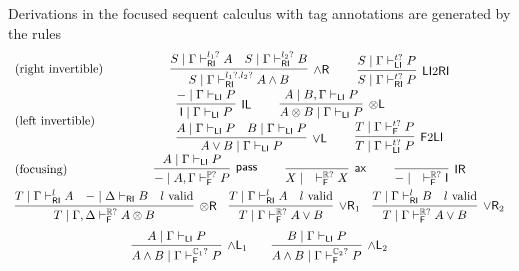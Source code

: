 \documentclass[submission,copyright,creativecommons]{eptcs}
\theoremstyle{definition}
\newcommand{\tl}{\otimes \mathsf{L}}
\newcommand{\tr}{\otimes \mathsf{R}}
\newcommand{\pass}{\mathsf{pass}}
\newcommand{\unitl}{\mathsf{IL}}
\newcommand{\unitr}{\mathsf{IR}}
\newcommand{\andlone}{\land \mathsf{L}_{1}}
\newcommand{\andltwo}{\land \mathsf{L}_{2}}
\newcommand{\andr}{\land \mathsf{R}}
\newcommand{\orl}{\lor \mathsf{L}}
\newcommand{\orrone}{\lor \mathsf{R}_{1}}
\newcommand{\orrtwo}{\lor \mathsf{R}_{2}}
\newcommand{\ax}{\mathsf{ax}}
\newcommand{\ot}{\otimes}
\newcommand{\I}{\mathsf{I}}
\newcommand{\RI}{\mathsf{RI}}
\newcommand{\LI}{\mathsf{LI}}
\newcommand{\F}{\mathsf{F}}
\newcommand{\tP}{\mathbb{P}}
\newcommand{\tCone}{\mathbb{C}_1}
\newcommand{\tCtwo}{\mathbb{C}_2}
\newcommand{\tE}{\mathbb{R}}
\newcommand{\proofbox}[1]{\begin{tabular}{l} #1 \end{tabular}}
\begin{document}
Derivations in the focused sequent calculus with tag annotations are generated by the rules
\begin{equation}\label{eq:focus}
  \begin{array}{lc}
    \text{(right invertible)} & %
    \proofbox{
      \infer[\andr]{S \mid \Gamma \vdash^{l_1?, l_2?}_{\RI} A \land B}{
        S \mid \Gamma \vdash^{l_1?}_{\RI} A
        &
        S \mid \Gamma \vdash^{l_2?}_{\RI} B
      }
    \qquad
    \infer[\LI 2 \RI]{S \mid \Gamma \vdash^{t?}_{\RI} P}{S \mid \Gamma \vdash^{t?}_{\LI} P}
    }
    \\[10pt]
    \text{(left invertible)} & %
    \proofbox{
      \infer[\unitl]{\I \mid \Gamma \vdash_{\LI} P}{{-} \mid \Gamma \vdash_{\LI} P}
    \qquad
    \infer[\tl]{A \ot B \mid \Gamma \vdash_{\LI} P}{A \mid B , \Gamma \vdash_{\LI} P}
    \\
    \infer[\orl]{A \lor B \mid \Gamma \vdash_\LI P}{
      A \mid \Gamma \vdash_\LI P
      &
      B \mid \Gamma \vdash_\LI P
    }
    \qquad
    \infer[\F 2 \LI]{T \mid \Gamma \vdash^{t?}_{\LI} P}{T \mid \Gamma \vdash^{t?}_{\F} P}
    }
    \\[10pt]
    \text{(focusing)} &    %
    \proofbox{
    \infer[\pass]{{-} \mid A , \Gamma \vdash^{\tP?}_{\F} P }{
        A \mid \Gamma \vdash_{\LI} P
    }
    \qquad
    \infer[\ax]{X \mid \quad \vdash^{\tE?}_{\F} X}{}
    \qquad
    \infer[\unitr]{{-} \mid \quad \vdash^{\tE?}_{\F} \I}{}
    }
    \\[10pt]
    \multicolumn{2}{c}{
    \infer[\tr]{T \mid \Gamma , \Delta \vdash^{\tE?}_{\F} A \ot B}{
      T \mid \Gamma \vdash^{l}_{\RI} A
      &
      {-} \mid \Delta \vdash_{\RI} B
      &
      l \ \text{valid}
    }
    \quad
    \infer[\orrone]{T \mid \Gamma \vdash^{\tE?}_{\F} A \lor B}{
      T \mid \Gamma \vdash^{l}_{\RI} A
      &
      l \ \text{valid}
    }
    \quad
    \infer[\orrtwo]{T \mid \Gamma \vdash^{\tE?}_{\F} A \lor B}{
      T \mid \Gamma \vdash^{l}_{\RI} B
      &
      l \ \text{valid}
    }
    }
    \\[6pt]
    \multicolumn{2}{c}{
    \infer[\andlone]{A \land B \mid \Gamma \vdash^{\tCone?}_{\F} P}{A \mid \Gamma \vdash_{\LI} P}
    \qquad
    \infer[\andltwo]{A \land B \mid \Gamma \vdash^{\tCtwo?}_{\F} P}{B \mid \Gamma \vdash_{\LI} P}
    }
  \end{array}
\end{equation}
\end{document}
